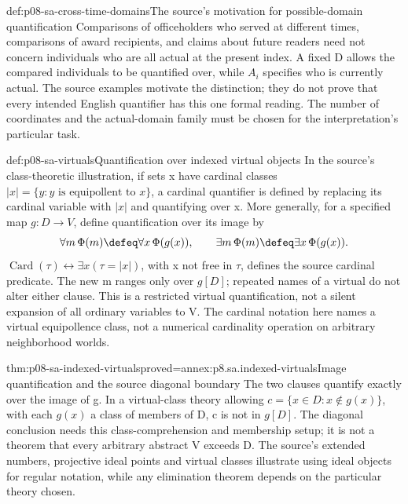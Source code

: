 \begin{hbexample}{def:p08-sa-cross-time-domains}{The source's motivation for possible-domain quantification}
Comparisons of officeholders who served at different times, comparisons
of award recipients, and claims about future readers need not concern
individuals who are all actual at the present index. A fixed D allows
the compared individuals to be quantified over, while \(A_i\) specifies
who is currently actual. The source examples motivate the distinction;
they do not prove that every intended English quantifier has this one
formal reading. The number of coordinates and the actual-domain family
must be chosen for the interpretation's particular task.
\end{hbexample}

\begin{hbmethod}{def:p08-sa-virtuals}{Quantification over indexed virtual objects}
In the source's class-theoretic illustration, if sets x have cardinal
classes \(|x|=\{y:y\text{ is equipollent to }x\}\), a cardinal
quantifier is defined by replacing its cardinal variable with \(|x|\)
and quantifying over x. More generally, for a specified map
\(g:D\to V\), define quantification over its image by
\[
 \forall m\,\Phi(m)\defeq\forall x\,\Phi(g(x)),\qquad
 \exists m\,\Phi(m)\defeq\exists x\,\Phi(g(x)).
\]
\(\operatorname{Card}(\tau)\leftrightarrow\exists x(\tau=|x|)\),
with x not free in \(\tau\), defines the source cardinal predicate.
The new m ranges only over \(g[D]\); repeated names of a virtual
do not alter either clause. This is a restricted virtual quantification,
not a silent expansion of all ordinary variables to V. The cardinal
notation here names a virtual equipollence class, not a numerical
cardinality operation on arbitrary neighborhood worlds.
\end{hbmethod}

\begin{hbtheorem}{thm:p08-sa-indexed-virtuals}{proved=annex:p8.sa.indexed-virtuals}{Image quantification and the source diagonal boundary}
The two clauses quantify exactly over the image of g. In a virtual-class
theory allowing \(c=\{x\in D:x\notin g(x)\}\), with each
\(g(x)\) a class of members of D, c is not in \(g[D]\).
The diagonal conclusion needs this class-comprehension and membership
setup; it is not a theorem that every arbitrary abstract V exceeds D.
The source's extended numbers, projective ideal points and virtual classes
illustrate using ideal objects for regular notation, while any elimination
theorem depends on the particular theory chosen.
\end{hbtheorem}

